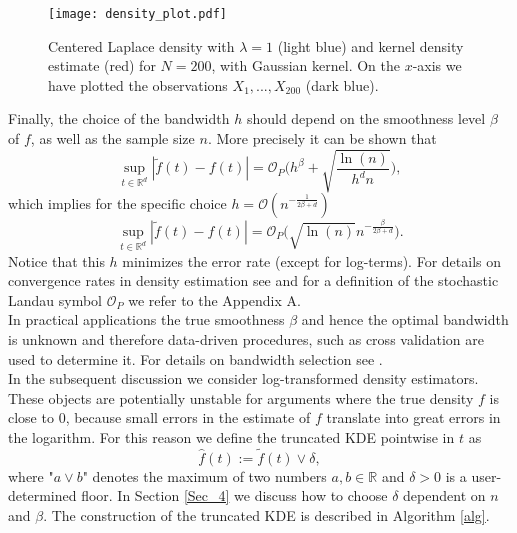 \documentclass[conference]{IEEEtran}
\begin{document}
\begin{figure}
\centering
\texttt{[image: density\_plot.pdf]}\\
\caption{ Centered Laplace density with $\lambda=1$ (light blue) and kernel density estimate (red) for $N=200$, with Gaussian kernel. On the $x$-axis we have plotted the observations $X_1,...,X_{200}$ (dark blue).}
\end{figure}

Finally, the choice of the bandwidth $h$ should depend on the smoothness level $\beta$ of $f$, as well as the sample size $n$. More precisely it can be shown that 
\begin{equation} \label{Eq_KDE_rate_1}
    \sup_{t \in \mathbb{R}^d} |\tilde f(t)-f(t)| = \mathcal{O}_P \Big( h^\beta + \sqrt{\frac{\ln(n)}{h^d n}}\Big),
\end{equation}
which implies for the specific choice
 $h= \mathcal{O}(n^{-\frac{1}{2\beta+d}})$ 
\begin{equation} \label{Eq_KDE_rate_2}
    \sup_{t \in \mathbb{R}^d} |\tilde f(t)-f(t)| = \mathcal{O}_P \Big( \sqrt{\ln(n)} n^{-\frac{\beta}{2\beta+d}}\Big).
\end{equation}
 Notice that this $h$ minimizes the error rate (except for log-terms).
For details on convergence rates in density estimation see  \cite{jiang2017} and for a definition of the stochastic Landau symbol $\mathcal{O}_P$ we refer to the Appendix A.\\
 In practical applications the true smoothness $\beta$ and hence the optimal bandwidth is unknown and therefore data-driven procedures, such as cross validation are used to determine it. For details on bandwidth selection see \cite{Gramacki}. \\
In the subsequent discussion we consider log-transformed density estimators. These objects are potentially unstable for arguments where the true density $f$ is close to $0$, because small errors in the estimate of $f$ translate into great errors in the logarithm. For this reason we define the truncated KDE pointwise in $t$ as 
$$
\hat f (t) := \tilde f(t) \lor \delta,
$$
where "$a \lor b$" denotes the maximum of two numbers $a, b \in \mathbb{R}$ and $\delta>0$ is a user-determined floor. In Section \ref{Sec_4} we discuss how to choose $\delta$ dependent on $n$ and $\beta$. The construction of the truncated KDE is described in Algorithm \ref{alg}. 
\end{document}
